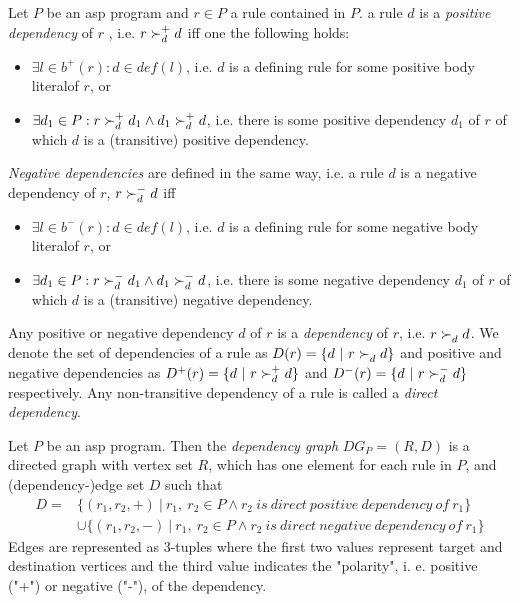 \begin{definition}[Dependencies]
\label{def:prelims-asp-semantics-dependencies}
Let $P$ be an \gls{asp} program and $r \in P$ a rule contained in $P$. a rule $d$ is a \emph{positive dependency} of $r$ , i.e. $ r \succ_{d}^{+} d$ iff one the following holds:
\begin{itemize}
	\item $\exists l \in b^{+}(r): d \in \mathit{def}(l) $, i.e. $d$ is a defining rule for some positive body literalof $r$, or
	\item $\exists d_1 \in P: r \succ_{d}^{+} d_1 \land d_1 \succ_{d}^{+} d$, i.e. there is some positive dependency $d_1$ of $r$ of which $d$ is a (transitive) positive dependency.
\end{itemize}
\emph{Negative dependencies} are defined in the same way, i.e. a rule $d$ is a negative dependency of $r$, $r \succ_{d}^{-} d$ iff
\begin{itemize}
	\item $\exists l \in b^{-}(r): d \in \mathit{def}(l)$, i.e. $d$ is a defining rule for some negative body literalof $r$, or
	\item $\exists d_1 \in P: r \succ_{d}^{-} d_1 \land d_1 \succ_{d}^{-} d$, i.e. there is some negative dependency $d_1$ of $r$ of which $d$ is a (transitive) negative dependency.
\end{itemize}
Any positive or negative dependency $d$ of $r$ is a \emph{dependency} of $r$, i.e. $r \succ_{d}^{} d$.
We denote the set of dependencies of a rule as $D(r) = \{ d\ |\ r \succ_{d}^{} d\}$ and positive and negative dependencies as $D^{+}(r) = \{ d\ |\ r \succ_{d}^{+} d\}$ and $D^{-}(r) = \{ d\ |\ r \succ_{d}^{-} d\}$ respectively. Any non-transitive dependency of a rule is called a \emph{direct dependency}.
\end{definition}

\begin{definition}
\label{def:prelims-asp-semantics-depgraph}
Let $P$ be an \gls{asp} program. Then the \emph{dependency graph}  $\mathit{DG}_P = (R, D)$ is a directed graph with vertex set $R$, which has one element for each rule in $P$, and (dependency-)edge set $D$ such that
\begin{align*}
	D = &\{ (r_1, r_2, +)\ |\ r_1,\ r_2 \in P \land r_2\ \mathit{is\ direct\ positive\ dependency\ of}\ r_1 \}\\ &\cup
\{ (r_1, r_2, -)\ |\ r_1,\ r_2 \in P \land r_2\ \mathit{is\ direct\ negative\ dependency\ of}\ r_1 \}
\end{align*}
Edges are represented as 3-tuples where the first two values represent target and destination vertices and the third value indicates the "polarity", i. e. positive ("+") or negative ("-"), of the dependency.
\end{definition}


